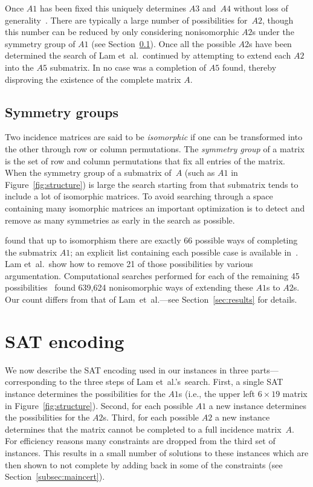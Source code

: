 \documentclass[letterpaper]{article}
\begin{document}
Once $A1$ has been fixed this uniquely determines $A3$ and~$A4$ without loss of
generality~\cite{lam1985estimates}.
There are typically a large number of
possibilities for~$A2$, though this number can be reduced by only considering nonisomorphic $A2$s
under the symmetry group of $A1$ (see Section~\ref{subsec:symmetry}).
Once all the possible $A2$s have been determined the search of Lam et~al.~continued by
attempting to extend each $A2$ into the $A5$ submatrix.  In no case was
a completion of $A5$ found, thereby disproving the existence of the complete matrix $A$.

\subsection{Symmetry groups}\label{subsec:symmetry}

Two incidence matrices are said to be \emph{isomorphic} if one can be transformed into
the other through row or column permutations.  The \emph{symmetry group} of a matrix
is the set of row and column permutations that fix all entries of the matrix.
When the symmetry group of a submatrix of~$A$ (such as $A1$ in Figure~\ref{fig:structure}) is large
the search starting from that submatrix tends to include a lot of isomorphic matrices.
To avoid searching through a space containing many isomorphic matrices
an important optimization is to detect and remove as many symmetries as early in the search as possible.

\cite{lam1985estimates} found that up to isomorphism there are exactly 66 possible ways of completing
the submatrix $A1$; an explicit list containing each possible case is
available in~\cite{kaski2006classification}.
Lam et~al.~show how to remove 21 of those possibilities by various argumentation.
Computational searches performed for each of the remaining 45
possibilities~\cite{lam1989non} found 639,624 nonisomorphic ways of extending these $A1$s to $A2$s.
Our count differs from that of
Lam~et~al.---see Section~\ref{sec:results} for details.

\section{SAT encoding}\label{sec:encoding}

We now describe the SAT encoding used in our instances
in three parts---corresponding to the three steps of Lam et~al.'s~search.
First, a single SAT instance determines the possibilities for the $A1$s
(i.e., the upper left $6\times19$ matrix in Figure~\ref{fig:structure}).
Second, for each possible $A1$
a new instance determines the possibilities for the $A2$s.
Third, for each possible $A2$ a new instance determines that
the matrix cannot be completed to a full incidence matrix~$A$.
For efficiency reasons many constraints are dropped from the third set of
instances.  This results in a small number of solutions to these
instances which are then shown to not complete by adding back in
some of the constraints (see Section~\ref{subsec:maincert}).
\end{document}
